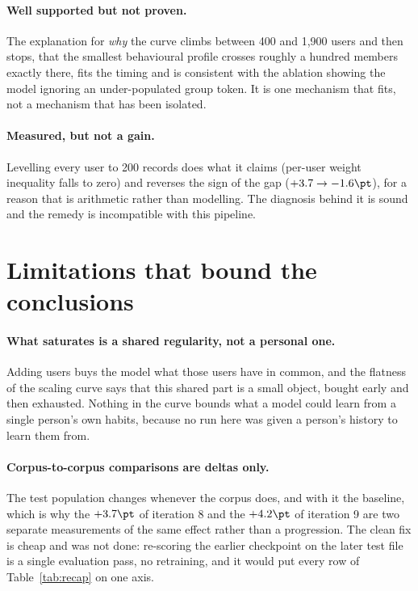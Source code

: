 \paragraph{Well supported but not proven.} The explanation for \emph{why} the
curve climbs between 400 and 1{,}900 users and then stops, that the smallest
behavioural profile crosses roughly a hundred members exactly there, fits the
timing and is consistent with the ablation showing the model ignoring an
under-populated group token. It is one mechanism that fits, not a mechanism that
has been isolated.

\paragraph{Measured, but not a gain.} Levelling every user to 200 records does
what it claims (per-user weight inequality falls to zero) and reverses the sign
of the gap ($+3.7 \rightarrow -1.6\pt$), for a reason that is arithmetic rather
than modelling. The diagnosis behind it is sound and the remedy is incompatible
with this pipeline.

\section{Limitations that bound the conclusions}

\paragraph{What saturates is a shared regularity, not a personal one.} Adding
users buys the model what those users have in common, and the flatness of the
scaling curve says that this shared part is a small object, bought early and
then exhausted. Nothing in the curve bounds what a model could learn from a
single person's own habits, because no run here was given a person's history to
learn them from.

\paragraph{Corpus-to-corpus comparisons are deltas only.} The test population
changes whenever the corpus does, and with it the baseline, which is why the
$+3.7\pt$ of iteration 8 and the $+4.2\pt$ of iteration 9 are two separate
measurements of the same effect rather than a progression. The clean fix is cheap
and was not done: re-scoring the earlier checkpoint on the later test file is a
single evaluation pass, no retraining, and it would put every row of
Table~\ref{tab:recap} on one axis.

